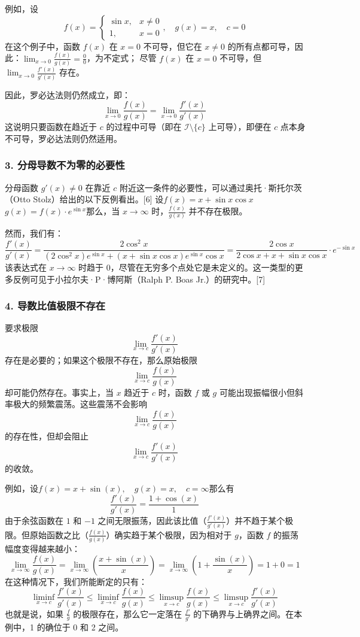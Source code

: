 例如，设
$$
f(x) = \begin{cases}
\sin x, & x \ne 0 \\
1, & x = 0
\end{cases}
,\quad g(x) = x,\quad c = 0~
$$
在这个例子中，函数 $f(x)$ 在 $x = 0$ 不可导，但它在 $x \ne 0$ 的所有点都可导，因此：$\lim_{x \to 0} \frac{f(x)}{g(x)} = \frac{0}{0}$，为不定式；
尽管 $f(x)$ 在 $x = 0$ 不可导，但 $\lim_{x \to 0} \frac{f'(x)}{g'(x)}$ 存在。

因此，罗必达法则仍然成立，即：
$$
\lim_{x \to 0} \frac{f(x)}{g(x)} = \lim_{x \to 0} \frac{f'(x)}{g'(x)}~
$$
这说明只要函数在趋近于 $c$ 的过程中可导（即在 $\mathcal{I} \setminus \{c\}$ 上可导），即便在 $c$ 点本身不可导，罗必达法则仍然适用。
\subsubsection{3. 分母导数不为零的必要性}
分母函数 $g'(x) \neq 0$ 在靠近 $c$ 附近这一条件的必要性，可以通过奥托·斯托尔茨（Otto Stolz）给出的以下反例看出。[6] 设$f(x) = x + \sin x \cos x$
$g(x) = f(x) \cdot e^{\sin x}$那么，当 $x \to \infty$ 时，$\frac{f(x)}{g(x)}$ 并不存在极限。

然而，我们有：
$$
\frac{f'(x)}{g'(x)} = \frac{2\cos^2 x}{(2\cos^2 x)e^{\sin x} + (x + \sin x \cos x)e^{\sin x} \cos x}
= \frac{2\cos x}{2\cos x + x + \sin x \cos x} \cdot e^{-\sin x}~
$$
该表达式在 $x \to \infty$ 时趋于 0，尽管在无穷多个点处它是未定义的。这一类型的更多反例可见于小拉尔夫·P·博阿斯（Ralph P. Boas Jr.）的研究中。[7]
\subsubsection{4. 导数比值极限不存在}
要求极限
$$
\lim_{x \to c} \frac{f'(x)}{g'(x)}~
$$
存在是必要的；如果这个极限不存在，那么原始极限
$$
\lim_{x \to c} \frac{f(x)}{g(x)}~
$$
却可能仍然存在。事实上，当 $x$ 趋近于 $c$ 时，函数 $f$ 或 $g$ 可能出现振幅很小但斜率极大的频繁震荡。这些震荡不会影响
$$
\lim_{x \to c} \frac{f(x)}{g(x)}~
$$
的存在性，但却会阻止
$$
\lim_{x \to c} \frac{f'(x)}{g'(x)}~
$$
的收敛。

例如，设$f(x) = x + \sin(x),\quad g(x) = x,\quad c = \infty$那么有
$$
\frac{f'(x)}{g'(x)} = \frac{1 + \cos(x)}{1}~
$$
由于余弦函数在 $1$ 和 $-1$ 之间无限振荡，因此该比值（$\frac{f'(x)}{g'(x)}$）并不趋于某个极限。但原始函数之比（$\frac{f(x)}{g(x)}$）确实趋于某个极限，因为相对于 $g$，函数 $f$ 的振荡幅度变得越来越小：
$$
\lim_{x \to \infty} \frac{f(x)}{g(x)} = \lim_{x \to \infty} \left( \frac{x + \sin(x)}{x} \right) = \lim_{x \to \infty} \left( 1 + \frac{\sin(x)}{x} \right) = 1 + 0 = 1~
$$
在这种情况下，我们所能断定的只有：
$$
\liminf_{x \to c} \frac{f'(x)}{g'(x)} \leq \liminf_{x \to c} \frac{f(x)}{g(x)} \leq \limsup_{x \to c} \frac{f(x)}{g(x)} \leq \limsup_{x \to c} \frac{f'(x)}{g'(x)}~
$$
也就是说，如果 $\frac{f}{g}$ 的极限存在，那么它一定落在 $\frac{f'}{g'}$ 的下确界与上确界之间。在本例中，1 的确位于 0 和 2 之间。

